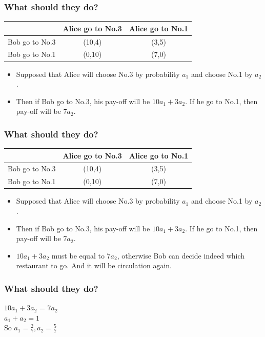 \documentclass{beamer}
\begin{document}
\begin{frame}
\frametitle{What should they do?}
\begin{tabular}{|c|c|c|}
\hline
\hline
    & {\color{red}Alice} go to No.3 & {\color{red}Alice} go to No.1\\
\hline
{\color{blue}Bob} go to No.3 & ({\color{blue}10},{\color{red}4}) & ({\color{blue}3},{\color{red}5})\\
\hline
{\color{blue}Bob} go to No.1 & ({\color{blue}0},{\color{red}10}) & ({\color{blue}7},{\color{red}0})\\
\hline
\hline
\end{tabular}
\begin{itemize}
\item Supposed that Alice will choose No.3 by probability $a_1$ and choose No.1 by $a_2$.
\item Then if Bob go to No.3, his pay-off will be $10a_1+3a_2$. If he go to No.1, then pay-off will be $7a_2$.
\end{itemize}
\end{frame}

\begin{frame}
\frametitle{What should they do?}
\begin{tabular}{|c|c|c|}
\hline
\hline
    & {\color{red}Alice} go to No.3 & {\color{red}Alice} go to No.1\\
\hline
{\color{blue}Bob} go to No.3 & ({\color{blue}10},{\color{red}4}) & ({\color{blue}3},{\color{red}5})\\
\hline
{\color{blue}Bob} go to No.1 & ({\color{blue}0},{\color{red}10}) & ({\color{blue}7},{\color{red}0})\\
\hline
\hline
\end{tabular}
\begin{itemize}
\item Supposed that Alice will choose No.3 by probability $a_1$ and choose No.1 by $a_2$.
\item Then if Bob go to No.3, his pay-off will be $10a_1+3a_2$. If he go to No.1, then pay-off will be $7a_2$.
\item $10a_1+3a_2$ must be equal to $7a_2$, otherwise Bob can decide indeed which restaurant to go. And it will be circulation again.\\
\end{itemize}
\end{frame}

\begin{frame}
\frametitle{What should they do?}
        \qquad $10a_1+3a_2$ = $7a_2$ \\
        \qquad $a_1 + a_2 = 1$ \\
        \qquad So $a_1 = \frac{2}{7}, a_2 = \frac{5}{7}$
\end{frame}
\end{document}
